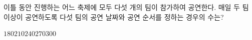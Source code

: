 \hspace*{2mm}\begin{minipage}[t]{\dimexpr\linewidth-2mm\relax}\vspace{0pt}
이틀 동안 진행하는 어느 축제에 모두 다섯 개의 팀이 참가하여 공연한다. 매일 두 팀 이상이 공연하도록 다섯 팀의 공연 날짜와 공연 순서를 정하는 경우의 수는? 
\begin{choices32}{$180$}{$210$}{$240$}{$270$}{$300$}\end{choices32}\end{minipage}
